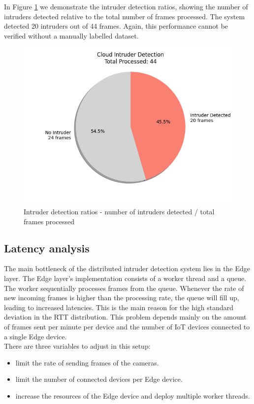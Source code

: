 \documentclass[conference]{IEEEtran}
\begin{document}
In Figure \ref{fig:intruder_ratios} we demonstrate the intruder detection ratios, showing the number of intruders detected relative to the total number of frames processed. The system detected 20 intruders out of 44 frames. Again, this performance cannot be verified without a manually labelled dataset. 


\begin{figure}[!h]
    \centering
    \includegraphics[width=1\linewidth]{./res/evaluation_with_latencies/intruder_ratios.png}
    \caption{Intruder detection ratios - number of intruders detected / total frames processed}
    
    \label{fig:intruder_ratios}
\end{figure}


\subsection{Latency analysis}
\label{sec:latency_analysis}
The main bottleneck of the distributed intruder detection system lies in the Edge layer. The Edge layer's implementation consists of a worker thread and a queue. The worker sequentially processes frames from the queue. Whenever the rate of new incoming frames is higher than the processing rate, the queue will fill up, leading to increased latencies. This is the main reason for the high standard deviation in the RTT distribution. This problem depends mainly on the amount of frames sent per minute per device and the number of IoT devices connected to a single Edge device. 
\\

There are three variables to adjust in this setup: 
\begin{itemize}
    \item limit the rate of sending frames of the cameras.
    \item limit the number of connected devices per Edge device.
    \item increase the resources of the Edge device and deploy multiple worker threads.
\end{itemize}
\hfill \break
\end{document}
